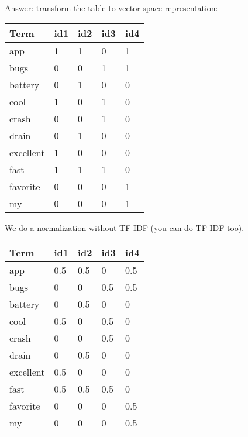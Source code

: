 \documentclass[11pt,a4paper]{report}
\begin{document}
\begin{multicols*}{2}
\noindent Answer: transform the table to vector space representation:

\begin{center}
\begin{tabular}{ | l | l l l l |} 
    \hline
    Term      & id1 & id2 & id3 & id4 \\ \hline
    app       & 1   & 1   & 0   & 1   \\
    bugs      & 0   & 0   & 1   & 1   \\
    battery   & 0   & 1   & 0   & 0   \\
    cool      & 1   & 0   & 1   & 0   \\
    crash     & 0   & 0   & 1   & 0   \\
    drain     & 0   & 1   & 0   & 0   \\
    excellent & 1   & 0   & 0   & 0   \\
    fast      & 1   & 1   & 1   & 0   \\
    favorite  & 0   & 0   & 0   & 1   \\
    my        & 0   & 0   & 0   & 1   \\
    \hline
\end{tabular}
\end{center}

\noindent We do a normalization without TF-IDF (you can do TF-IDF too). 

\begin{center}
\begin{tabular}{ | l | l l l l |} 
    \hline
    Term      & id1 & id2 & id3 & id4 \\ \hline
    app       & 0.5 & 0.5 & 0   & 0.5 \\
    bugs      & 0   & 0   & 0.5 & 0.5 \\
    battery   & 0   & 0.5 & 0   & 0   \\
    cool      & 0.5 & 0   & 0.5 & 0   \\
    crash     & 0   & 0   & 0.5 & 0   \\
    drain     & 0   & 0.5 & 0   & 0   \\
    excellent & 0.5 & 0   & 0   & 0   \\
    fast      & 0.5 & 0.5 & 0.5 & 0   \\
    favorite  & 0   & 0   & 0   & 0.5 \\
    my        & 0   & 0   & 0   & 0.5 \\
    \hline
\end{tabular}
\end{center}


\end{multicols*}
\end{document}
